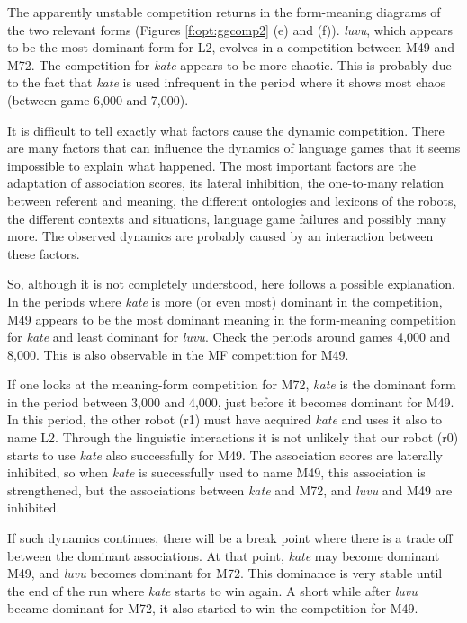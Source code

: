 The apparently unstable competition returns in the form-meaning diagrams of the two relevant forms (Figures \ref{f:opt:ggcomp2} (e) and (f)). {\it luvu}, which appears to be the most dominant form for L2, evolves in a competition between M49 and M72. The competition for {\it kate} appears to be more chaotic. This is probably due to the fact that {\it kate} is used infrequent in the period where it shows most chaos (between game 6,000 and 7,000).

It is difficult to tell exactly what factors cause the dynamic competition. There are many factors that can influence the dynamics of language games that it seems impossible to explain what happened. The most important factors are the adaptation of association scores, its lateral inhibition, the one-to-many relation between referent and meaning, the different ontologies and lexicons of the robots, the different contexts and situations, language game failures and possibly many more. The observed dynamics are probably caused by an interaction between these factors.


So, although it is not completely understood, here follows a possible explanation. In the periods where {\it kate} is more (or even most) dominant in the competition, M49 appears to be the most dominant meaning in the form-meaning competition for {\it kate} and least dominant for {\it luvu}. Check the periods around games 4,000 and 8,000. This is also observable in the MF competition for M49.

If one looks at the meaning-form competition for M72, {\it kate} is the dominant form in the period between 3,000 and 4,000, just before it becomes dominant for M49. In this period, the other robot (r1) must have acquired {\it kate} and uses it also to name L2. Through the linguistic interactions it is not unlikely that our robot (r0) starts to use {\it kate} also successfully for M49. The association scores are laterally inhibited, so when {\it kate} is successfully used to name M49, this association is strengthened, but the associations between {\it kate} and M72, and {\it luvu} and M49 are inhibited.

If such dynamics continues, there will be a break point where there is a trade off between the dominant associations. At that point, {\it kate} may become dominant M49, and {\it luvu} becomes dominant for M72. This dominance is very stable until the end of the run where {\it kate} starts to win again. A short while after {\it luvu} became dominant for M72, it also started to win the competition for M49.


